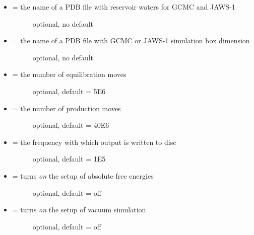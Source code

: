 \documentclass[letterpaper,10pt,english]{sphinxmanual}
\begin{document}
\begin{itemize}
\begin{description}
\end{description}

\item {} \begin{description}
\item[{ = the name of a PDB file with reservoir waters for GCMC and JAWS-1}] \leavevmode
optional, no default

\end{description}

\item {} \begin{description}
\item[{ = the name of a PDB file with GCMC or JAWS-1 simulation box dimension}] \leavevmode
optional, no default

\end{description}

\item {} \begin{description}
\item[{ = the number of equilibration moves}] \leavevmode
optional, default = 5E6

\end{description}

\item {} \begin{description}
\item[{ = the number of production moves}] \leavevmode
optional, default = 40E6

\end{description}

\item {} \begin{description}
\item[{ = the frequency with which output is written to disc}] \leavevmode
optional, default = 1E5

\end{description}

\item {} \begin{description}
\item[{ = turns \emph{on} the setup of absolute free energies}] \leavevmode
optional, default = off

\end{description}

\item {} \begin{description}
\item[{ = turns \emph{on} the setup of vacuum simulation}] \leavevmode
optional, default = off


\end{description}
\end{itemize}
\end{document}
